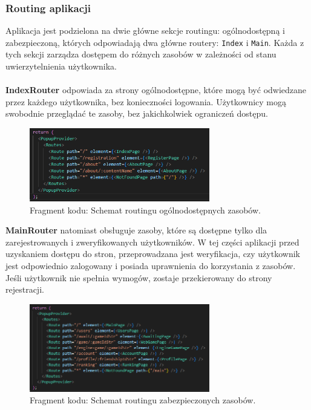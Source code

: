 \documentclass[twoside]{projektInzynierskiMS1}
\begin{document}
\newpage

\subsubsection{Routing aplikacji}

\noindent
Aplikacja jest podzielona na dwie główne sekcje routingu: ogólnodostępną i zabezpieczoną, których odpowiadają dwa główne routery: \texttt{Index} i \texttt{Main}. Każda z tych sekcji zarządza dostępem do różnych zasobów w zależności od stanu uwierzytelnienia użytkownika.
\\\\
\noindent
\textbf{IndexRouter} odpowiada za strony ogólnodostępne, które mogą być odwiedzane przez każdego użytkownika, bez konieczności logowania. Użytkownicy mogą swobodnie przeglądać te zasoby, bez jakichkolwiek ograniczeń dostępu.

\vspace{0.5cm}
\begin{figure}[h!]
    \centering
    \includegraphics[width=0.7\textwidth]{images/ex_index_router.png}
    \caption{Fragment kodu: Schemat routingu ogólnodostępnych zasobów.}
\end{figure}

\noindent
\textbf{MainRouter} natomiast obsługuje zasoby, które są dostępne tylko dla zarejestrowanych i zweryfikowanych użytkowników. W tej części aplikacji przed uzyskaniem dostępu do stron, przeprowadzana jest weryfikacja, czy użytkownik jest odpowiednio zalogowany i posiada uprawnienia do korzystania z zasobów. Jeśli użytkownik nie spełnia wymogów, zostaje przekierowany do strony rejestracji.

\vspace{0.5cm}
\begin{figure}[h!]
    \centering
    \includegraphics[width=0.7\textwidth]{images/ex_main_router.png}
    \caption{Fragment kodu: Schemat routingu zabezpieczonych zasobów.}
\end{figure}
\end{document}
